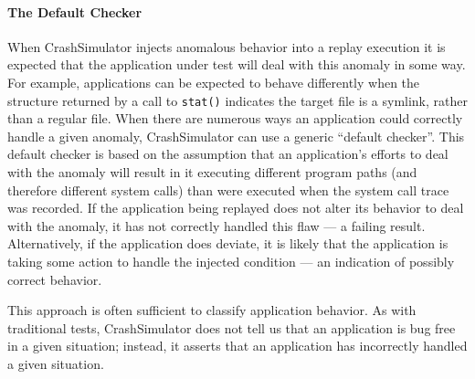 
    
    \paragraph{The Default Checker}

    When CrashSimulator injects anomalous behavior into a replay execution it is
    expected that the application under test will deal with this
    anomaly in some way. For example, applications
    can be expected to behave differently when
    the structure returned by a call to {\tt stat()} indicates the target file
    is a symlink, rather than a regular file.
    When there are numerous ways an
    application could correctly handle a given anomaly, CrashSimulator 
    can use a generic ``default checker''.  This default checker
    is based on the assumption that an application's efforts to deal with the anomaly
    will result in it executing different program paths (and therefore different
    system calls) than were executed when the system call trace
    was recorded.  If the application being replayed does not
    alter its behavior to deal with the anomaly, it has not
    correctly handled this flaw --- a failing result.  Alternatively, if the
    application does deviate,
    it is likely that the application is taking some action
    to handle the injected condition --- an indication of possibly correct
    behavior.

    This approach is often sufficient to classify application behavior. %
    As
    with traditional tests, CrashSimulator does not tell us that an application is
    bug free in a given situation; instead, it asserts that an application
    has incorrectly handled a given situation.
    

